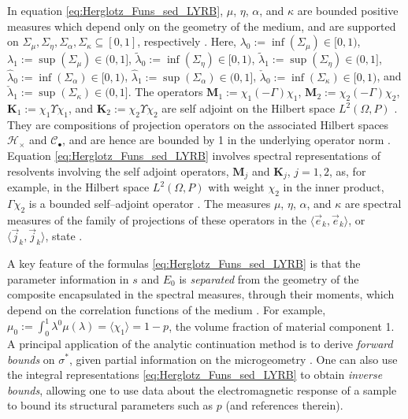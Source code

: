 \documentclass[english,12pt,jmp,graphicx]{revtex4-1}
\begin{document}
In equation
\eqref{eq:Herglotz_Funs_sed_LYRB}, $\mu$, $\eta$, $\alpha$, and $\kappa$
are bounded positive measures which depend only on the geometry of the
medium, and are supported on $\Sigma_\mu,\Sigma_\eta,\Sigma_\alpha,\Sigma_\kappa\subseteq[0,1]$, respectively
\cite{Golden:CMP-473,Bergman:AP-78}. Here, $\lambda_0:=\inf(\Sigma_\mu)\in[0,1)$, 
$\lambda_1:=\sup(\Sigma_\mu)\in(0,1]$, $\tilde{\lambda}_0:=\inf(\Sigma_\eta)\in[0,1)$,
$\tilde{\lambda}_1:=\sup(\Sigma_\eta)\in(0,1]$, $\hat{\lambda}_0:=\inf(\Sigma_\alpha)\in[0,1)$,
$\hat{\lambda}_1:=\sup(\Sigma_\alpha)\in(0,1]$, $\check{\lambda}_0:=\inf(\Sigma_\kappa)\in[0,1)$, and
$\check{\lambda}_1:=\sup(\Sigma_\kappa)\in(0,1]$. The operators
$\mathbf{M}_1:=\chi_1(-\Gamma)\chi_1$, $\mathbf{M}_2:=\chi_2(-\Gamma)\chi_2$,
$\mathbf{K}_1:=\chi_1\Upsilon\chi_1$, and $\mathbf{K}_2:=\chi_2\Upsilon\chi_2$ are self adjoint
on the Hilbert space $L^2(\Omega,P)$ \cite{Golden:CMP-473}. They are
compositions of projection operators on the associated Hilbert spaces
$\mathscr{H}_\times$ and $\mathscr{C}_\bullet$, and are hence are bounded by 1 in
the underlying operator norm
\cite{Folland:95,Golden:CMP-473}. Equation
\eqref{eq:Herglotz_Funs_sed_LYRB} involves spectral representations of
resolvents involving the self adjoint operators, $\mathbf{M}_j$ and
$\mathbf{K}_j$, $j=1,2$, as, for example, in the Hilbert space
$L^2(\Omega,P)$ with weight $\chi_2$ in the inner product, $\Gamma\chi_2$ is a 
bounded self--adjoint operator \cite{Golden:CMP-473}. The measures $\mu$,
$\eta$, $\alpha$, and $\kappa$ are spectral measures of the family of projections
of these operators in the $\langle\vec{e}_k,\vec{e}_k\rangle$, or
$\langle\vec{j}_k,\vec{j}_k\rangle$, state \cite{Golden:CMP-473,Reed-1980}.

A key feature of the formulas \eqref{eq:Herglotz_Funs_sed_LYRB} is
that the parameter information in $s$ and $E_0$ is {\it separated}
from the geometry of the composite encapsulated in the spectral
measures, through their moments, which depend on the correlation 
functions of the medium \cite{Golden:CMP-473}. For example, 
$\mu_0:=\int_0^1\lambda^0\mu(\lambda)=\langle\chi_1\rangle=1-p$, the volume fraction of material
component 1. A principal application of the analytic continuation
method is to derive \emph{forward bounds} on $\sigma^*$, given partial
information on the microgeometry
\cite{Bergman:PRL-1285,Milton:APL-300,Golden:CMP-473,Bergman:AP-78}. One  
can also use the integral representations
\eqref{eq:Herglotz_Funs_sed_LYRB} to obtain \emph{inverse bounds},
allowing one to use data about the electromagnetic response of a
sample to bound its structural parameters such as $p$
\cite{Golden:JoB:337} (and references therein).
         
\end{document}

